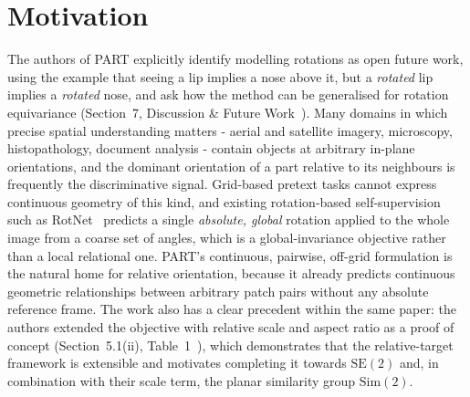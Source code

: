 \documentclass[11pt,a4paper]{article}
\begin{document}
\section{Motivation}
The authors of PART explicitly identify modelling rotations as open future work, using the example that seeing a lip implies a nose above it, but a \emph{rotated} lip implies a \emph{rotated} nose, and ask how the method can be generalised for rotation equivariance (Section~7, Discussion \& Future Work~\cite{part}). Many domains in which precise spatial understanding matters - aerial and satellite imagery, microscopy, histopathology, document analysis - contain objects at arbitrary in-plane orientations, and the dominant orientation of a part relative to its neighbours is frequently the discriminative signal. Grid-based pretext tasks cannot express continuous geometry of this kind, and existing rotation-based self-supervision such as RotNet~\cite{rotnet} predicts a single \emph{absolute, global} rotation applied to the whole image from a coarse set of angles, which is a global-invariance objective rather than a local relational one. PART's continuous, pairwise, off-grid formulation is the natural home for relative orientation, because it already predicts continuous geometric relationships between arbitrary patch pairs without any absolute reference frame. The work also has a clear precedent within the same paper: the authors extended the objective with relative scale and aspect ratio as a proof of concept (Section~5.1(ii), Table~1~\cite{part}), which demonstrates that the relative-target framework is extensible and motivates completing it towards $\mathrm{SE}(2)$ and, in combination with their scale term, the planar similarity group $\mathrm{Sim}(2)$.
\end{document}
